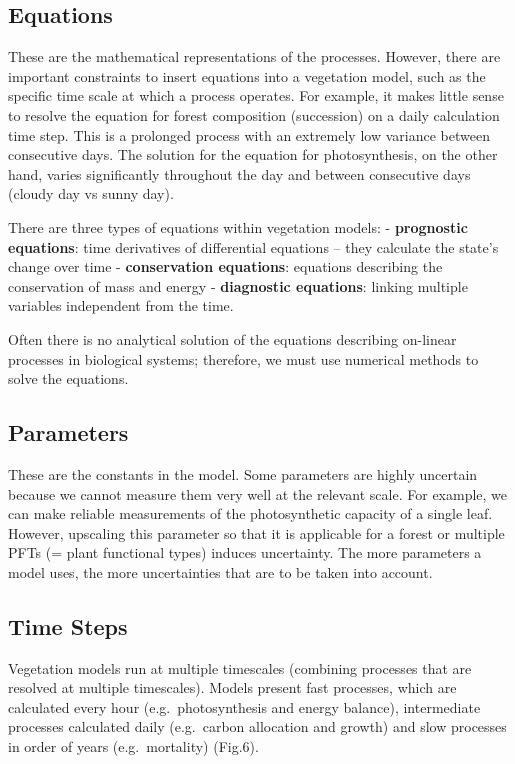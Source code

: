 \documentclass[
  12pt,
  oneside]{book}
\begin{document}
\hypertarget{equations}{%
\subsection{Equations}\label{equations}}

These are the mathematical representations of the processes. However, there are important constraints to insert equations into a vegetation model, such as the specific time scale at which a process operates. For example, it makes little sense to resolve the equation for forest composition (succession) on a daily calculation time step. This is a prolonged process with an extremely low variance between consecutive days. The solution for the equation for photosynthesis, on the other hand, varies significantly throughout the day and between consecutive days (cloudy day vs sunny day).

There are three types of equations within vegetation models:
- \textbf{prognostic equations}: time derivatives of differential equations -- they calculate the state's change over time
- \textbf{conservation equations}: equations describing the conservation of mass and energy
- \textbf{diagnostic equations}: linking multiple variables independent from the time.

Often there is no analytical solution of the equations describing on-linear processes in biological systems; therefore, we must use numerical methods to solve the equations.

\hypertarget{parameters}{%
\subsection{Parameters}\label{parameters}}

These are the constants in the model. Some parameters are highly uncertain because we cannot measure them very well at the relevant scale. For example, we can make reliable measurements of the photosynthetic capacity of a single leaf. However, upscaling this parameter so that it is applicable for a forest or multiple PFTs (= plant functional types) induces uncertainty. The more parameters a model uses, the more uncertainties that are to be taken into account.

\hypertarget{time-steps}{%
\subsection{Time Steps}\label{time-steps}}

Vegetation models run at multiple timescales (combining processes that are resolved at multiple timescales). Models present fast processes, which are calculated every hour (e.g.~photosynthesis and energy balance), intermediate processes calculated daily (e.g.~carbon allocation and growth) and slow processes in order of years (e.g.~mortality) (Fig.6).
\end{document}
